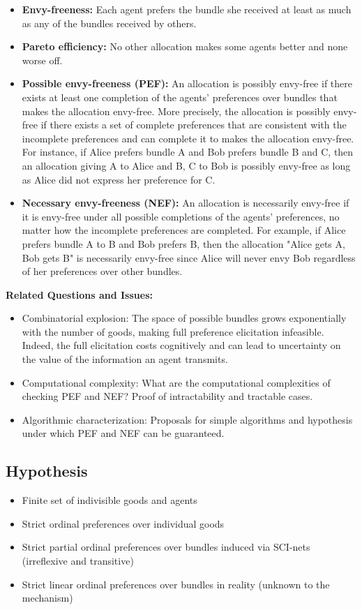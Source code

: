 \documentclass[12pt,a4paper]{article}
\begin{document}
\begin{itemize}
    \item \textbf{Envy-freeness:} Each agent prefers the bundle she received at least as much as any of the bundles received by others.
    \item \textbf{Pareto efficiency:} No other allocation makes some agents better and none worse off.
    \item \textbf{Possible envy-freeness (PEF):} An allocation is possibly envy-free if there exists at least one completion of the agents' preferences over bundles that makes the allocation envy-free. More precisely, the allocation is possibly envy-free if there exists a set of complete preferences that are consistent with the incomplete preferences and can complete it to makes the allocation envy-free. For instance, if Alice prefers bundle A and Bob prefers bundle B and C, then an allocation giving A to Alice and B, C to Bob is possibly envy-free as long as Alice did not express her preference for C. 
    \item \textbf{Necessary envy-freeness (NEF):} An allocation is necessarily envy-free if it is envy-free under all possible completions of the agents' preferences, no matter how the incomplete preferences are completed. For example, if Alice prefers bundle A to B and Bob prefers B, then the allocation "Alice gets A, Bob gets B" is necessarily envy-free since Alice will never envy Bob regardless of her preferences over other bundles.
\end{itemize}

\textbf{Related Questions and Issues:}
\begin{itemize}
    \item Combinatorial explosion: The space of possible bundles grows exponentially with the number of goods, making full preference elicitation infeasible. Indeed, the full elicitation costs cognitively and can lead to uncertainty on the value of the information an agent transmits.
    \item Computational complexity: What are the computational complexities of checking PEF and NEF? Proof of intractability and tractable cases.
    \item Algorithmic characterization: Proposals for simple algorithms and hypothesis under which PEF and NEF can be guaranteed.
\end{itemize}

\subsection*{Hypothesis}
\begin{itemize}
    \item Finite set of indivisible goods and agents
    \item Strict ordinal preferences over individual goods
    \item Strict partial ordinal preferences over bundles induced via SCI-nets (irreflexive and transitive)
    \item Strict linear ordinal preferences over bundles in reality (unknown to the mechanism)
\end{itemize}
\end{document}
